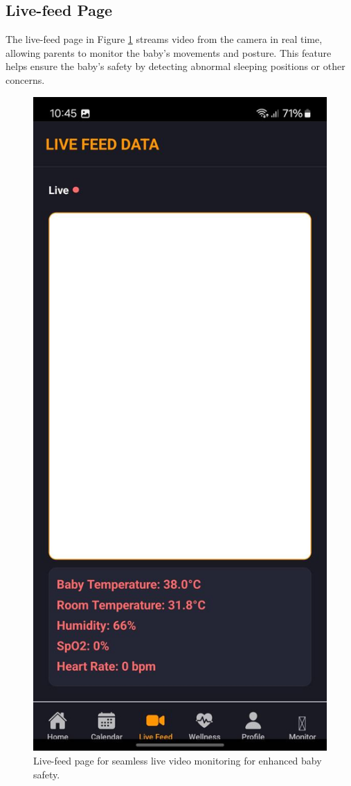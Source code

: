 \documentclass[12pt,a4paper]{report}
\begin{document}
\subsection{Live-feed Page}
The live-feed page in Figure \ref{fig:live-feed} streams video from the camera in real time, allowing parents to monitor the baby's movements and posture. This feature helps ensure the baby's safety by detecting abnormal sleeping positions or other concerns.
\begin{figure}[htbp]
  \centering
  \includegraphics[scale=0.2]{./pic/live-feed.jpeg}
  \caption{Live-feed page for seamless live video monitoring for enhanced baby safety.}
  \label{fig:live-feed}
\end{figure}
\end{document}
